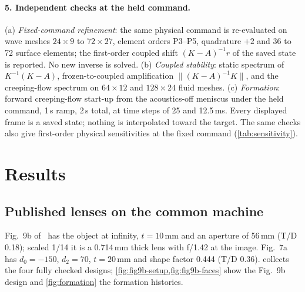 \documentclass[11pt,a4paper]{article}
\numberwithin{equation}{section}
\begin{document}
\paragraph{5. Independent checks at the held command.}
(a) \emph{Fixed-command refinement}: the same physical command is re-evaluated on
wave meshes $24\times9$ to $72\times27$, element orders P3--P5, quadrature $+2$ and
36 to 72 surface elements; the first-order coupled shift $(K-A)^{-1}r$ of the
saved state is reported. No new inverse is solved.
(b) \emph{Coupled stability}: static spectrum of $K^{-1}(K-A)$, frozen-to-coupled
amplification $\lVert(K-A)^{-1}K\rVert$, and the creeping-flow spectrum on
$64\times12$ and $128\times24$ fluid meshes.
(c) \emph{Formation}: forward creeping-flow start-up from the acoustics-off
meniscus under the held command, 1\,s ramp, 2\,s total, at time steps of 25 and
12.5\,ms. Every displayed frame is a saved state; nothing is interpolated toward
the target.
The same checks also give first-order physical sensitivities at the fixed command
(\cref{tab:sensitivity}).

\section{Results}\label{sec:results}

\subsection{Published lenses on the common machine}\label{sec:published}

Fig.~9b of~\cite{silva2020} has the object at infinity, $t=10$\,mm and an
aperture of 56\,mm (T/D 0.18); scaled 1/14 it is a 0.714\,mm thick lens with
f/1.42 at the image. Fig.~7a has $d_0=-150$, $d_2=70$, $t=20$\,mm and shape
factor 0.444 (T/D 0.36).  collects the four fully checked
designs; \cref{fig:fig9b-setup,fig:fig9b-faces} show the Fig.~9b design and
\cref{fig:formation} the formation histories.
\end{document}
